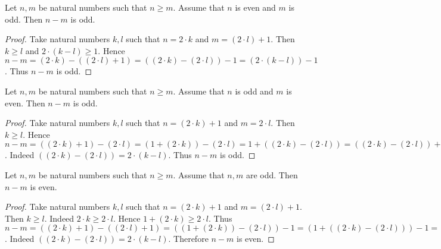 \documentclass[10pt]{article}
\begin{document}
  \begin{forthel}
    \begin{proposition}
      Let $n, m$ be natural numbers such that $n \geq m$.
      Assume that $n$ is even and $m$ is odd.
      Then $n - m$ is odd.
    \end{proposition}
    \begin{proof}
      Take natural numbers $k, l$ such that $n = 2 \cdot k$ and $m = (2 \cdot l) + 1$.
      Then $k \geq l$ and $2 \cdot (k - l) \geq 1$.
      Hence $n - m
        = (2 \cdot k) - ((2 \cdot l) + 1)
        = ((2 \cdot k) - (2 \cdot l)) - 1
        = (2 \cdot (k - l)) - 1$.
      Thus $n - m$ is odd.
    \end{proof}
  \end{forthel}

  \begin{forthel}
    \begin{corollary}
      Let $n, m$ be natural numbers such that $n \geq m$.
      Assume that $n$ is odd and $m$ is even.
      Then $n - m$ is odd.
    \end{corollary}
    \begin{proof}
      Take natural numbers $k, l$ such that $n = (2 \cdot k) + 1$ and $m = 2 \cdot l$.
      Then $k \geq l$.
      Hence $n - m
        = ((2 \cdot k) + 1) - (2 \cdot l)
        = (1 + (2 \cdot k)) - (2 \cdot l)
        = 1 + ((2 \cdot k) - (2 \cdot l))
        = ((2 \cdot k) - (2 \cdot l)) + 1
        = (2 \cdot (k - l)) + 1$.
      Indeed $((2 \cdot k) - (2 \cdot l)) = 2 \cdot (k - l)$. %
      Thus $n - m$ is odd.
    \end{proof}
  \end{forthel}

  \begin{forthel}
    \begin{proposition}
      Let $n, m$ be natural numbers such that $n \geq m$.
      Assume that $n, m$ are odd.
      Then $n - m$ is even.
    \end{proposition}
    \begin{proof}
      Take natural numbers $k, l$ such that $n = (2 \cdot k) + 1$ and $m = (2 \cdot l) + 1$.
      Then $k \geq l$.
      Indeed $2 \cdot k \geq 2 \cdot l$.
      Hence $1 + (2 \cdot k) \geq 2 \cdot l$.
      Thus $n - m
        = ((2 \cdot k) + 1) - ((2 \cdot l) + 1)
        = ((1 + (2 \cdot k)) - (2 \cdot l)) - 1
        = (1 + ((2 \cdot k) - (2 \cdot l))) - 1
        = (1 + (2 \cdot (k - l))) - 1
        = ((2 \cdot (k - l)) + 1) - 1
        = 2 \cdot (k - l)$.
      Indeed $((2 \cdot k) - (2 \cdot l)) = 2 \cdot (k - l)$. %
      Therefore $n - m$ is even.
    \end{proof}
  \end{forthel}
\end{document}
